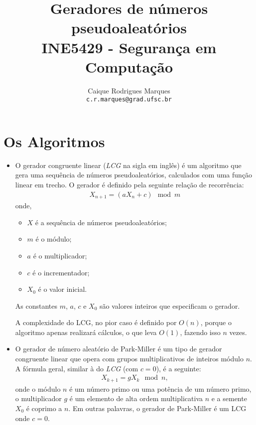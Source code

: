 \documentclass{article}
\title{\textbf{Geradores de números pseudoaleatórios \\
        \large INE5429 - Segurança em Computação}}
\author{
    Caique Rodrigues Marques \\
    {\texttt{c.r.marques@grad.ufsc.br}}
}
\date{}
\begin{document}
\maketitle
\section*{Os Algoritmos}
    \begin{itemize}
        \item O gerador congruente linear (\textit{LCG} na sigla em inglês) é
            um algoritmo que gera uma sequência de números pseudoaleatórios,
            calculados com uma função linear em trecho. O gerador é definido
            pela seguinte relação de recorrência:
        \begin{align*}
            X_{n+1} = (aX_{n} + c) \mod{m}
        \end{align*}
        onde, 
        \begin{itemize}
            \item $X$ é a sequência de números pseudoaleatórios;
            \item $m$ é o módulo;
            \item $a$ é o multiplicador;
            \item $c$ é o incrementador;
            \item $X_{0}$ é o valor inicial.
        \end{itemize}
        As constantes $m$, $a$, $c$ e $X_{0}$ são valores inteiros que
            especificam o gerador.
        
        A complexidade do LCG, no pior caso é definido por $O(n)$, porque o
            algoritmo apenas realizará cálculos, o que leva $O(1)$, fazendo
            isso $n$ vezes.
        
        \item O gerador de número aleatório de Park-Miller é um tipo de gerador
            congruente linear que opera com grupos multiplicativos de inteiros
            módulo $n$. A fórmula geral, similar à do \textit{LCG} (com $c =
            0$), é a seguinte:
        \begin{align*}
            X_{k+1} = gX_{k} \mod{n},
        \end{align*}
        onde o módulo $n$ é um número primo ou uma potência de um número primo,
            o multiplicador $g$ é um elemento de alta ordem multiplicativa $n$
            e a semente $X_{0}$ é coprimo a $n$. Em outras palavras, o gerador
            de Park-Miller é um LCG onde $c = 0$.
        

\end{itemize}
\end{document}
